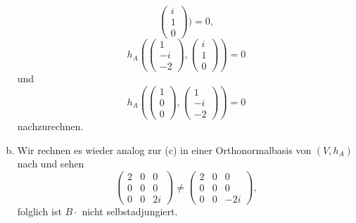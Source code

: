 \documentclass{article}
\theoremstyle{definition}
\begin{document}
\begin{enumerate}[(a)]
$$\begin{pmatrix}
		i\\1\\0
	\end{pmatrix}) = 0,$$ $$h_A(\begin{pmatrix}
		1\\ -i\\ -2
	\end{pmatrix}, \begin{pmatrix}
		i\\1\\0
	\end{pmatrix}) = 0$$ und $$h_A(\begin{pmatrix}
		1\\ 0 \\ 0
	\end{pmatrix}, \begin{pmatrix}
		1\\ -i\\ -2
	\end{pmatrix}) = 0$$ nachzurechnen.
	\item Wir rechnen es wieder analog zur (c) in einer Orthonormalbasis von $(V, h_A)$ nach und sehen
	$$\begin{pmatrix}
		2 & 0 & 0\\
		0 & 0 & 0\\
		0 & 0 & 2i
	\end{pmatrix} \neq \begin{pmatrix}
		2 & 0 & 0\\
		0 & 0 & 0\\
		0 & 0 & -2i
	\end{pmatrix}, $$ folglich ist $B\cdot $ nicht selbstadjungiert.
\end{enumerate}
\end{document}
